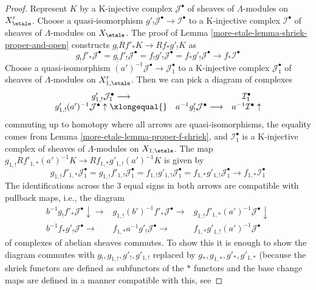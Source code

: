 \begin{proof}
Represent $K$ by a K-injective complex $\mathcal{J}^\bullet$ of
sheaves of $\Lambda$-modules on $X'_\etale$. Choose a quasi-isomorphism
$g'_!\mathcal{J}^\bullet \to \mathcal{I}^\bullet$ to a
K-injective complex $\mathcal{I}^\bullet$ of
sheaves of $\Lambda$-modules on $X_\etale$.
The proof of Lemma \ref{more-etale-lemma-shriek-proper-and-open}
constructs $g_!Rf'_*K \to Rf_*g'_!K$ as
$$
g_!f'_*\mathcal{J}^\bullet =
g_!f'_!\mathcal{J}^\bullet =
f_!g'_!\mathcal{J}^\bullet =
f_*g'_!\mathcal{J}^\bullet \to
f_*\mathcal{I}^\bullet
$$
Choose a quasi-isomorphism
$(a')^{-1}\mathcal{J}^\bullet \to \mathcal{J}_1^\bullet$
to a K-injective complex $\mathcal{J}_1^\bullet$ of
sheaves of $\Lambda$-modules on $X'_{1, \etale}$.
Then we can pick a diagram of complexes
$$
\begin{array}{ccc}g'_{1, !}\mathcal{J}_1^\bullet \longrightarrow &  & \mathcal{I}_1^\bullet \\ g'_{1, !}(a')^{-1}\mathcal{J}^\bullet \uparrow\xlongequal{} & a^{-1}g'_!\mathcal{J}^\bullet \longrightarrow & a^{-1}\mathcal{I}^\bullet \uparrow\end{array}
$$
commuting up to homotopy where all arrows are quasi-isomorphisms, the
equality comes from Lemma \ref{more-etale-lemma-proper-f-shriek},
and $\mathcal{I}_1^\bullet$ is a K-injective complex of sheaves of
$\Lambda$-modules on $X_{1, \etale}$. The map
$g_{1, !}Rf'_{1, *}(a')^{-1}K \to Rf_{1, *}g'_{1, !}(a')^{-1}K$ is given by
$$
g_{1, !}f'_{1, *}\mathcal{J}_1^\bullet =
g_{1, !}f'_{1, !}\mathcal{J}_1^\bullet =
f_{1, !}g'_{1, !}\mathcal{J}_1^\bullet =
f_{1, *}g'_{1, !}\mathcal{J}_1^\bullet \to
f_{1, *}\mathcal{I}_1^\bullet
$$
The identifications across the $3$ equal signs in both arrows
are compatible with pullback maps, i.e., the diagram
$$
\begin{array}{ccc}b^{-1}g_!f'_*\mathcal{J}^\bullet \downarrow\longrightarrow & g_{1, !}(b')^{-1}f'_*\mathcal{J}^\bullet \longrightarrow & g_{1, !}f'_{1, *}(a')^{-1}\mathcal{J}^\bullet \downarrow \\ b^{-1}f_*g'_!\mathcal{J}^\bullet \longrightarrow & f_{1, *}a^{-1}g'_!\mathcal{J}^\bullet \longrightarrow & f_{1, *}g'_{1, !}(a')^{-1}\mathcal{J}^\bullet\end{array}
$$
of complexes of abelian sheaves commutes. To show this it is enough to
show the diagram commutes with $g_!, g_{1, !}, g'_!, g'_{1, !}$
replaced by $g_*, g_{1, *}, g'_*, g'_{1, *}$ (because the shriek
functors are defined as subfunctors of the $*$ functors and the
base change maps are defined in a manner compatible with this, see

\end{proof}
